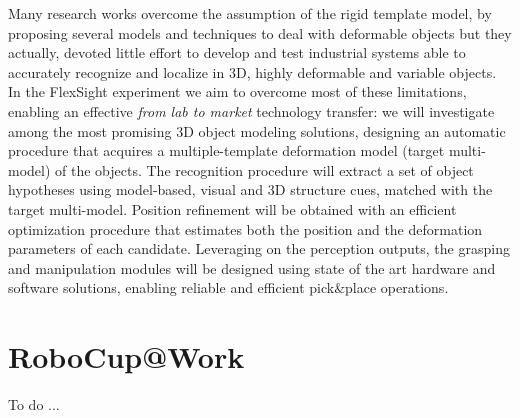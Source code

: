 Many research works overcome the assumption of the rigid template model, by proposing several models and techniques to deal with deformable objects but they actually, devoted little effort to develop and test industrial systems able to accurately recognize and localize in 3D, highly deformable and variable objects. In the FlexSight experiment we aim to overcome most of these limitations, enabling an effective \emph{from lab to market} technology transfer: we will investigate among the most promising 3D object modeling solutions, designing an automatic procedure that acquires a multiple-template deformation model (target multi-model) of the objects. The recognition procedure will extract a set of object hypotheses using model-based, visual and 3D structure cues, matched with the target multi-model. Position refinement will be obtained with an efficient optimization procedure that estimates both the position and the deformation parameters of each candidate. Leveraging on the perception outputs, the grasping and manipulation modules will be designed using state of the art hardware and software solutions, enabling reliable and efficient pick\&place operations.

\section{RoboCup@Work}\label{apx:robocupatwork}
To do ...